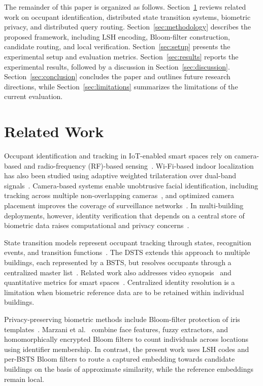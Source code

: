 \documentclass[pdflatex,sn-mathphys-num]{sn-jnl}%
\theoremstyle{thmstyleone}%
\theoremstyle{thmstyletwo}%
\theoremstyle{thmstylethree}%
\begin{document}
The remainder of this paper is organized as follows. Section~\ref{sec:related} reviews related work on occupant identification, distributed state transition systems, biometric privacy, and distributed query routing. Section~\ref{sec:methodology} describes the proposed framework, including LSH encoding, Bloom-filter construction, candidate routing, and local verification. Section~\ref{sec:setup} presents the experimental setup and evaluation metrics. Section~\ref{sec:results} reports the experimental results, followed by a discussion in Section~\ref{sec:discussion}. Section~\ref{sec:conclusion} concludes the paper and outlines future research directions, while Section~\ref{sec:limitations} summarizes the limitations of the current evaluation.



\section{Related Work}
\label{sec:related}

Occupant identification and tracking in IoT-enabled smart spaces rely on camera-based and radio-frequency (RF)-based sensing~\cite{mohan2020,WZSYGWLLHSC2025}. Wi-Fi-based indoor localization has also been studied using adaptive weighted trilateration over dual-band signals~\cite{MSSAB2019}. Camera-based systems enable unobtrusive facial identification, including tracking across multiple non-overlapping cameras~\cite{nair2021}, and optimized camera placement improves the coverage of surveillance networks~\cite{SM2022}. In multi-building deployments, however, identity verification that depends on a central store of biometric data raises computational and privacy concerns~\cite{mohan2020}.

State transition models represent occupant tracking through states, recognition events, and transition functions~\cite{MJG2011}. The DSTS extends this approach to multiple buildings, each represented by a BSTS, but resolves occupants through a centralized master list~\cite{mohan2020}. Related work also addresses video synopsis~\cite{NGA2022} and quantitative metrics for smart spaces~\cite{MMJ2025}. Centralized identity resolution is a limitation when biometric reference data are to be retained within individual buildings.

Privacy-preserving biometric methods include Bloom-filter protection of iris templates~\cite{rathgeb2014}. Marzani et al.~\cite{marzani2026} combine face features, fuzzy extractors, and homomorphically encrypted Bloom filters to count individuals across locations using identifier membership. In contrast, the present work uses LSH codes and per-BSTS Bloom filters to route a captured embedding towards candidate buildings on the basis of approximate similarity, while the reference embeddings remain local.
\end{document}

